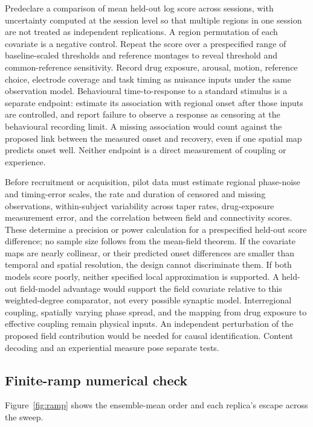 \documentclass{article}
\begin{document}
Predeclare a comparison of mean held-out log score across sessions, with uncertainty computed at the session level so that multiple regions in one session are not treated as independent replications. A region permutation of each covariate is a negative control. Repeat the score over a prespecified range of baseline-scaled thresholds and reference montages to reveal threshold and common-reference sensitivity. Record drug exposure, arousal, motion, reference choice, electrode coverage and task timing as nuisance inputs under the same observation model. Behavioural time-to-response to a standard stimulus is a separate endpoint: estimate its association with regional onset after those inputs are controlled, and report failure to observe a response as censoring at the behavioural recording limit. A missing association would count against the proposed link between the measured onset and recovery, even if one spatial map predicts onset well. Neither endpoint is a direct measurement of coupling or experience.

Before recruitment or acquisition, pilot data must estimate regional phase-noise and timing-error scales, the rate and duration of censored and missing observations, within-subject variability across taper rates, drug-exposure measurement error, and the correlation between field and connectivity scores. These determine a precision or power calculation for a prespecified held-out score difference; no sample size follows from the mean-field theorem. If the covariate maps are nearly collinear, or their predicted onset differences are smaller than temporal and spatial resolution, the design cannot discriminate them. If both models score poorly, neither specified local approximation is supported. A held-out field-model advantage would support the field covariate relative to this weighted-degree comparator, not every possible synaptic model. Interregional coupling, spatially varying phase spread, and the mapping from drug exposure to effective coupling remain physical inputs. An independent perturbation of the proposed field contribution would be needed for causal identification. Content decoding and an experiential measure pose separate tests.

\subsection{Finite-ramp numerical check}

Figure~\ref{fig:ramp} shows the ensemble-mean order and each replica's escape across the sweep.
\end{document}
